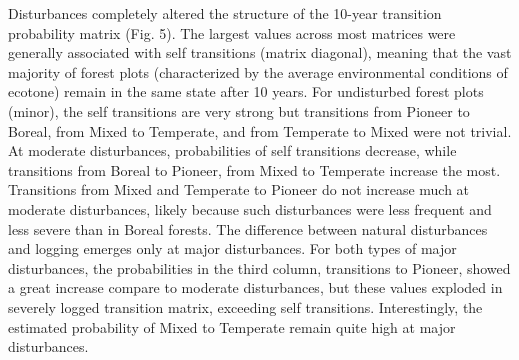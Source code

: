 \documentclass[a4paperpaper,]{article}
\begin{document}
\pagebreak

Disturbances completely altered the structure of the 10-year transition
probability matrix (Fig. 5). The largest values across most matrices
were generally associated with self transitions (matrix diagonal),
meaning that the vast majority of forest plots (characterized by the
average environmental conditions of ecotone) remain in the same state
after 10 years. For undisturbed forest plots (minor), the self
transitions are very strong but transitions from Pioneer to Boreal, from
Mixed to Temperate, and from Temperate to Mixed were not trivial. At
moderate disturbances, probabilities of self transitions decrease, while
transitions from Boreal to Pioneer, from Mixed to Temperate increase the
most. Transitions from Mixed and Temperate to Pioneer do not increase
much at moderate disturbances, likely because such disturbances were
less frequent and less severe than in Boreal forests. The difference
between natural disturbances and logging emerges only at major
disturbances. For both types of major disturbances, the probabilities in
the third column, transitions to Pioneer, showed a great increase
compare to moderate disturbances, but these values exploded in severely
logged transition matrix, exceeding self transitions. Interestingly, the
estimated probability of Mixed to Temperate remain quite high at major
disturbances.
\end{document}
